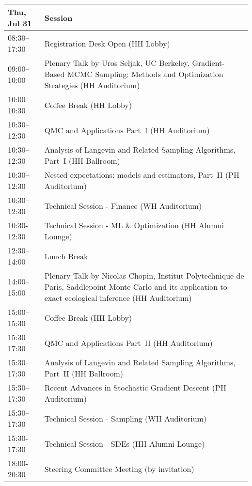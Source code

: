 \begin{table}
{\footnotesize
\begin{tabularx}{\textwidth}{>{\hsize=0.32\hsize}X|>{\hsize=1.7\hsize}X}
\hline
\textbf{Thu, Jul 31} & \textbf{Session} \\
\hline
\cellcolor{\EmptyColor}08:30–17:30 & \cellcolor{\EmptyColor}Registration Desk Open (HH Lobby) \\
\cellcolor{\PlenaryColor}09:00–10:00 & \cellcolor{\PlenaryColor}Plenary Talk by Uros Seljak, UC Berkeley, Gradient-Based MCMC Sampling: Methods and Optimization Strategies (HH Auditorium) \\
\cellcolor{\EmptyColor}10:00–10:30 & \cellcolor{\EmptyColor}Coffee Break (HH Lobby) \\
\cellcolor{\SessionTitleColor}10:30–12:30 & \cellcolor{\SessionTitleColor}QMC and Applications Part~I (HH Auditorium) \\
\cellcolor{\SessionTitleColor}10:30–12:30 & \cellcolor{\SessionTitleColor}Analysis of Langevin and Related Sampling Algorithms, Part~I (HH Ballroom) \\
\cellcolor{\SessionTitleColor}10:30–12:30 & \cellcolor{\SessionTitleColor}Nested expectations: models and estimators, Part~II (PH Auditorium) \\
\cellcolor{\SessionLightColor}10:30–12:30 & \cellcolor{\SessionLightColor}Technical Session - Finance (WH Auditorium) \\
\cellcolor{\SessionLightColor}10:30-12:30 & \cellcolor{\SessionLightColor}Technical Session - ML \& Optimization (HH Alumni Lounge) \\
\cellcolor{\EmptyColor}12:30–14:00 & \cellcolor{\EmptyColor}Lunch Break \\
\cellcolor{\PlenaryColor}14:00–15:00 & \cellcolor{\PlenaryColor}Plenary Talk by Nicolas Chopin, Institut Polytechnique de Paris, Saddlepoint Monte Carlo and its application to exact ecological inference (HH Auditorium) \\
\cellcolor{\EmptyColor}15:00–15:30 & \cellcolor{\EmptyColor}Coffee Break (HH Lobby) \\
\cellcolor{\SessionTitleColor}15:30–17:30 & \cellcolor{\SessionTitleColor}QMC and Applications Part~II (HH Auditorium) \\
\cellcolor{\SessionTitleColor}15:30–17:30 & \cellcolor{\SessionTitleColor}Analysis of Langevin and Related Sampling Algorithms, Part~II (HH Ballroom) \\
\cellcolor{\SessionTitleColor}15:30–17:30 & \cellcolor{\SessionTitleColor}Recent Advances in Stochastic Gradient Descent (PH Auditorium) \\
\cellcolor{\SessionLightColor}15:30–17:30 & \cellcolor{\SessionLightColor}Technical Session - Sampling (WH Auditorium) \\
\cellcolor{\SessionLightColor}15:30-17:30 & \cellcolor{\SessionLightColor}Technical Session - SDEs (HH Alumni Lounge) \\
\cellcolor{\SessionTitleColor}18:00-20:30 & \cellcolor{\SessionTitleColor}Steering Committee Meeting (by invitation) \\
\hline
\end{tabularx}
}
\end{table}

